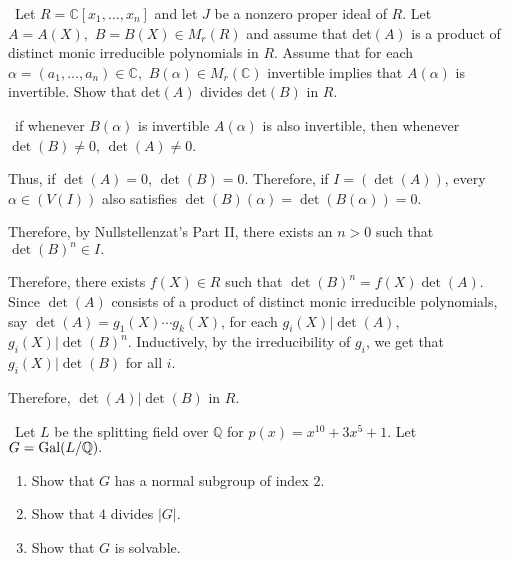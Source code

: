\documentclass[12pt]{Qual}
\begin{document}
\begin{problem} $\,$
Let $R=\mathbb{C}[x_1,...,x_n]$ and let $J$ be a nonzero proper ideal of $R.$ Let $A=A(X),$ $B=B(X)\in M_r(R)$ and assume that det$(A)$ is a product of distinct monic irreducible polynomials in $R.$ Assume that for each $\alpha=(a_1,...,a_n)\in\mathbb{C},$ $B(\alpha)\in M_r(\mathbb{C})$ invertible implies that $A(\alpha)$ is invertible. Show that det$(A)$ divides det$(B)$ in $R.$
\end{problem}


\begin{solution}$\,$
if whenever $B(\alpha)$ is invertible $A(\alpha)$ is also invertible, then whenever $\det(B)\not=0$, $\det(A)\not=0.$

Thus, if $\det(A)=0$, $\det(B)=0$. Therefore, if $I=(\det(A))$, every $\alpha\in (V(I))$ also satisfies $\det(B)(\alpha)=\det(B(\alpha))=0$.

Therefore, by Nullstellenzat's Part II, there exists an $n>0$ such that $\det(B)^n\in I.$

Therefore, there exists $f(X)\in R$ such that $\det(B)^n=f(X)\det(A).$ Since $\det(A)$ consists of a product of distinct monic irreducible polynomials, say $\det(A)=g_1(X)\cdots g_k(X)$, for each $g_i(X)|\det(A),$ $g_i(X)|\det(B)^n$. Inductively, by the irreducibility of $g_i$, we get that $g_i(X)|\det(B)$ for all $i.$

Therefore, $\det(A)|\det(B)$ in $R.$
\end{solution}
\newpage



\begin{problem} $\,$
Let $L$ be the splitting field over $\mathbb{Q}$ for $p(x)=x^{10}+3x^5+1$. Let $G=\text{Gal}(L/\mathbb{Q}).$
\begin{enumerate}[label=(\alph*)]
    \item Show that $G$ has a normal subgroup of index $2$.
    \item Show that $4$ divides $|G|.$
    \item Show that $G$ is solvable.
\end{enumerate}
\end{problem}
\end{document}
